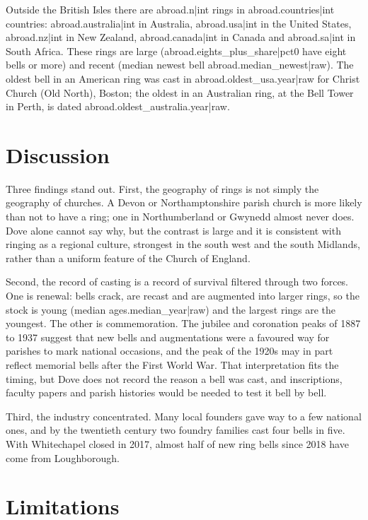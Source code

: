 \documentclass[11pt,a4paper]{article}
\begin{document}
Outside the British Isles there are {{abroad.n|int}} rings in {{abroad.countries|int}} countries: {{abroad.australia|int}} in Australia, {{abroad.usa|int}} in the United States, {{abroad.nz|int}} in New Zealand, {{abroad.canada|int}} in Canada and {{abroad.sa|int}} in South Africa. These rings are large ({{abroad.eights_plus_share|pct0}} have eight bells or more) and recent (median newest bell {{abroad.median_newest|raw}}). The oldest bell in an American ring was cast in {{abroad.oldest_usa.year|raw}} for Christ Church (Old North), Boston; the oldest in an Australian ring, at the Bell Tower in Perth, is dated {{abroad.oldest_australia.year|raw}}.

\section{Discussion}

Three findings stand out. First, the geography of rings is not simply the geography of churches. A Devon or Northamptonshire parish church is more likely than not to have a ring; one in Northumberland or Gwynedd almost never does. Dove alone cannot say why, but the contrast is large and it is consistent with ringing as a regional culture, strongest in the south west and the south Midlands, rather than a uniform feature of the Church of England.

Second, the record of casting is a record of survival filtered through two forces. One is renewal: bells crack, are recast and are augmented into larger rings, so the stock is young (median {{ages.median_year|raw}}) and the largest rings are the youngest. The other is commemoration. The jubilee and coronation peaks of 1887 to 1937 suggest that new bells and augmentations were a favoured way for parishes to mark national occasions, and the peak of the 1920s may in part reflect memorial bells after the First World War. That interpretation fits the timing, but Dove does not record the reason a bell was cast, and inscriptions, faculty papers and parish histories would be needed to test it bell by bell.

Third, the industry concentrated. Many local founders gave way to a few national ones, and by the twentieth century two foundry families cast four bells in five. With Whitechapel closed in 2017, almost half of new ring bells since 2018 have come from Loughborough.

\section{Limitations}
\end{document}
